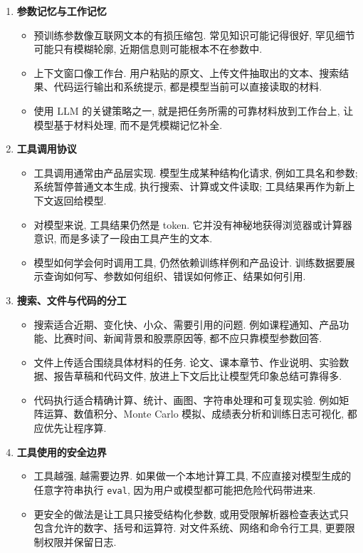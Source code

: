 \documentclass{../nndlcourse}
\begin{document}
\begin{enumerate}
  \item \textbf{参数记忆与工作记忆}
    \begin{itemize}
      \item 预训练参数像互联网文本的有损压缩包. 常见知识可能记得很好, 罕见细节可能只有模糊轮廓, 近期信息则可能根本不在参数中.
      \item 上下文窗口像工作台. 用户粘贴的原文、上传文件抽取出的文本、搜索结果、代码运行输出和系统提示, 都是模型当前可以直接读取的材料.
      \item 使用 LLM 的关键策略之一, 就是把任务所需的可靠材料放到工作台上, 让模型基于材料处理, 而不是凭模糊记忆补全.
    \end{itemize}
  \item \textbf{工具调用协议}
    \begin{itemize}
      \item 工具调用通常由产品层实现. 模型生成某种结构化请求, 例如工具名和参数; 系统暂停普通文本生成, 执行搜索、计算或文件读取; 工具结果再作为新上下文返回给模型.
      \item 对模型来说, 工具结果仍然是 token. 它并没有神秘地获得浏览器或计算器意识, 而是多读了一段由工具产生的文本.
      \item 模型如何学会何时调用工具, 仍然依赖训练样例和产品设计. 训练数据要展示查询如何写、参数如何组织、错误如何修正、结果如何引用.
    \end{itemize}
  \item \textbf{搜索、文件与代码的分工}
    \begin{itemize}
      \item 搜索适合近期、变化快、小众、需要引用的问题. 例如课程通知、产品功能、比赛时间、新闻背景和股票原因等, 都不应只靠模型参数回答.
      \item 文件上传适合围绕具体材料的任务. 论文、课本章节、作业说明、实验数据、报告草稿和代码文件, 放进上下文后比让模型凭印象总结可靠得多.
      \item 代码执行适合精确计算、统计、画图、字符串处理和可复现实验. 例如矩阵运算、数值积分、Monte Carlo 模拟、成绩表分析和训练日志可视化, 都应优先让程序算.
    \end{itemize}
  \item \textbf{工具使用的安全边界}
    \begin{itemize}
      \item 工具越强, 越需要边界. 如果做一个本地计算工具, 不应直接对模型生成的任意字符串执行 \texttt{eval}, 因为用户或模型都可能把危险代码带进来.
      \item 更安全的做法是让工具只接受结构化参数, 或用受限解析器检查表达式只包含允许的数字、括号和运算符. 对文件系统、网络和命令行工具, 更要限制权限并保留日志.

\end{itemize}
\end{enumerate}
\end{document}
